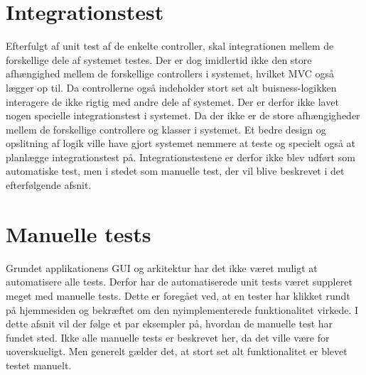 \section{Integrationstest}
%
%
Efterfulgt af unit test af de enkelte controller, skal integrationen mellem de forskellige dele af systemet testes. Der er dog imidlertid ikke den store afhængighed mellem de forskellige controllers i systemet, hvilket MVC også lægger op til. Da controllerne også indeholder stort set alt buisness-logikken interagere de ikke rigtig med andre dele af systemet. Der er derfor ikke lavet nogen specielle integrationstest i systemet. Da der ikke er de store afhængigheder mellem de forskellige controllere og klasser i systemet. Et bedre design og opslitning af logik ville have gjort systemet nemmere at teste og specielt også at planlægge integrationstest på. Integrationstestene er derfor ikke blev udført som automatiske test, men i stedet som manuelle test, der vil blive beskrevet i det efterfølgende afsnit.
 \\

\section{Manuelle tests}
Grundet applikationens GUI og arkitektur har det ikke været muligt at automatisere alle tests. Derfor har de automatiserede unit tests været suppleret meget med manuelle tests. Dette er foregået ved, at en tester har klikket rundt på hjemmesiden og bekræftet om den nyimplementerede funktionalitet virkede. I dette afsnit vil der følge et par eksempler på, hvordan de manuelle test har fundet sted. Ikke alle manuelle tests er beskrevet her, da det ville være for uoverskueligt. Men generelt gælder det, at stort set alt funktionalitet er blevet testet manuelt.

